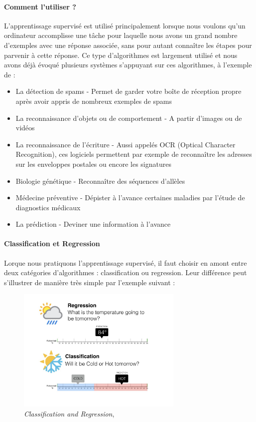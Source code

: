 \paragraph{Comment l'utiliser ?} L'apprentissage supervisé est utilisé principalement lorsque nous voulons qu'un ordinateur accomplisse une tâche pour laquelle nous avons un grand nombre
d'exemples avec une réponse associée, sans pour autant connaître les étapes pour parvenir à cette réponse. Ce type d'algorithmes est largement utilisé et nous avons déjà évoqué plusieurs
systèmes s'appuyant sur ces algorithmes, à l'exemple de :
\begin{itemize}
    \item La détection de spams - Permet de garder votre boîte de réception propre après avoir appris de nombreux exemples de spams
    \item La reconnaissance d'objets ou de comportement - A partir d'images ou de vidéos
    \item La reconnaissance de l'écriture - Aussi appelés OCR (Optical Character Recognition), ces logiciels permettent par exemple de reconnaître les adresses sur les
    enveloppes postales ou encore les signatures
    \item Biologie génétique - Reconnaître des séquences d'allèles
    \item Médecine préventive - Dépister à l'avance certaines maladies par l'étude de diagnostics médicaux
    \item La prédiction - Deviner une information à l'avance \cite{MachineLearning2}
\end{itemize}

\paragraph{Classification et Regression} Lorque nous pratiquons l'apprentissage supervisé, il faut choisir en amont entre deux catégories d'algorithmes : classification ou
regression. Leur différence peut s'illustrer de manière très simple par l'exemple suivant :

\begin{figure}[h]
    \centering
    \includegraphics[width=300px]{chapters/03/images/classification-regression.jpg}
    \caption{\label{supervised learning}\emph{Classification and Regression}, \cite{MachineLearning6}}
\end{figure}

